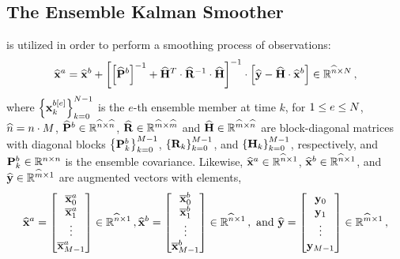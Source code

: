 \subsection{The Ensemble Kalman Smoother}
\label{subsec:EnKFS}
%
is utilized in order to perform a smoothing process of observations:
\begin{eqnarray}
\widehat{{\bf x}}^a = \widehat{{\bf x}}^b  + \left [ \left [ \widehat{{\bf P}}^b \right ]^{-1} + \widehat{{\bf H}}^T \cdot \widehat{{\bf R}}^{-1} \cdot \widehat{{\bf H}} \right ]^{-1} \cdot \left [ \widehat{{\bf y}}-\widehat{{\bf H}} \cdot \widehat{{\bf x}}^b \right ] \in \mathbb{R}^{\widehat{n} \times N} \,,
\end{eqnarray}
%
where $\left \{ {\bf x}^{b[e]}_k \right \}_{k=0}^{N-1}$ is the $e$-th ensemble member at time $k$, for $1 \le e \le N$, $\widehat{n} = n \cdot M$, $\widehat{{\bf P}}^b \in \mathbb{R}^{\widehat{n} \times \widehat{n}}$, $\widehat{{\bf R}} \in \mathbb{R}^{\widehat{m} \times \widehat{m}}$ and $\widehat{{\bf H}} \in \mathbb{R}^{\widehat{m} \times \widehat{n}}$ are block-diagonal matrices with diagonal blocks $\left \{ {\bf P}^b_k \right \}_{k=0}^{M-1}$, $\left \{ {\bf R}_k \right \}_{k=0}^{M-1}$, and $\left \{ {\bf H}_k \right \}_{k=0}^{M-1}$, respectively, and ${\bf P}^b_k \in \mathbb{R}^{n \times n}$ is the ensemble covariance. Likewise, $\widehat{{\bf x}}^a \in \mathbb{R}^{\widehat{n} \times 1}$, $\widehat{{\bf x}}^b \in \mathbb{R}^{\widehat{n} \times 1}$, and $\widehat{{\bf y}} \in \mathbb{R}^{\widehat{m} \times 1}$ are augmented vectors with elements, 
\begin{eqnarray}
\widehat{{\bf x}}^a = \begin{bmatrix}
\overline{\bf x}^a_0 \\
\overline{\bf x}^a_1 \\
\vdots \\
\overline{\bf x}^a_{M-1}
\end{bmatrix} \in \mathbb{R}^{\widehat{n} \times 1} \,,
\widehat{{\bf x}}^b = \begin{bmatrix}
\overline{\bf x}^b_0 \\
\overline{\bf x}^b_1 \\
\vdots \\
\overline{\bf x}^b_{M-1}
\end{bmatrix} \in \mathbb{R}^{\widehat{n} \times 1} \,, \text{ and }
\widehat{{\bf y}} = \begin{bmatrix}
{\bf y}_0 \\
{\bf y}_1 \\
\vdots \\
{\bf y}_{M-1}
\end{bmatrix} \in \mathbb{R}^{\widehat{m} \times 1} \,,
\end{eqnarray}
%
